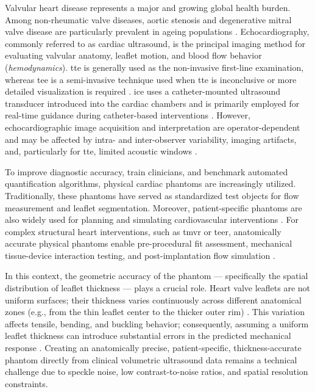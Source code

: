 Valvular heart disease represents a major and growing global health burden. Among non-rheumatic valve diseases, aortic stenosis and degenerative mitral valve disease are particularly prevalent in ageing populations \cite{chen2024global}. Echocardiography, commonly referred to as cardiac ultrasound, is the principal imaging method for evaluating valvular anatomy, leaflet motion, and blood flow behavior (\emph{hemodynamics}). \Gls{tte} is generally used as the non-invasive first-line examination, whereas \gls{tee} is a semi-invasive technique used when \gls{tte} is inconclusive or more detailed visualization is required \cite{praz20252025}. \Gls{ice} uses a catheter-mounted ultrasound transducer introduced into the cardiac chambers and is primarily employed for real-time guidance during catheter-based interventions \cite{enriquez2018use}. However, echocardiographic image acquisition and interpretation are operator-dependent and may be affected by intra- and inter-observer variability, imaging artifacts, and, particularly for \gls{tte}, limited acoustic windows \cite{robinson2020practical}.

To improve diagnostic accuracy, train clinicians, and benchmark automated quantification algorithms, physical cardiac phantoms are increasingly utilized. Traditionally, these phantoms have served as standardized test objects for flow measurement and leaflet segmentation. Moreover, patient-specific phantoms are also widely used for planning and simulating cardiovascular interventions \cite{illi2022translating}. For complex structural heart interventions, such as \gls{tmvr} \cite{izzo20163d} or \gls{teer}, anatomically accurate physical phantoms enable pre-procedural fit assessment, mechanical tissue-device interaction testing, and post-implantation flow simulation \cite{vukicevic20173d}.

In this context, the geometric accuracy of the phantom --- specifically the spatial distribution of leaflet thickness --- plays a crucial role. Heart valve leaflets are not uniform surfaces; their thickness varies continuously across different anatomical zones (e.g., from the thin leaflet center to the thicker outer rim) \cite{rausch2013mechanics}. This variation affects tensile, bending, and buckling behavior; consequently, assuming a uniform leaflet thickness can introduce substantial errors in the predicted mechanical response \cite{lin2023impact}. Creating an anatomically precise, patient-specific, thickness-accurate phantom directly from clinical volumetric ultrasound data remains a technical challenge due to speckle noise, low contrast-to-noise ratios, and spatial resolution constraints.

